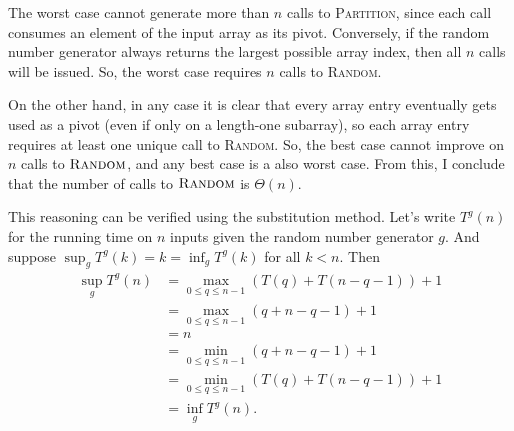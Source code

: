 \documentclass[
]{article}
\begin{document}
The worst case cannot generate more than $n$ calls to \textsc{Partition}, since each call consumes an element of the input array as its pivot.  Conversely, if the random number generator always returns the largest possible array index, then all $n$ calls will be issued.  So, the worst case requires $n$ calls to \textsc{Random}. 


On the other hand, in any case it is clear that every array entry eventually gets used as a pivot (even if only on a length-one subarray), so each array entry requires at least one unique call to \textsc{Random}.  So, the best case cannot improve on $n$ calls to $\textsc{Random}$, and any best case is a also worst case.  From this, I conclude that the number of calls to $\textsc{Random}$ is $\Theta(n)$.

This reasoning can be verified using the substitution method.  Let's write $T^g(n)$ for the running time on $n$ inputs given the random number generator $g$.  
And suppose $\sup_gT^g(k)= k = \inf_gT^g(k)$ for all $k<n$.  Then
\begin{align*}
  \sup_g T^g(n) &= \max_{0\leq q\leq n - 1}(T(q) + T(n-q-1)) + 1
  \\
                &=
                  \max_{0\leq q\leq n-1}(q + n - q - 1) + 1
  \\
                &=
                  n
  \\
                &=
                  \min_{0\leq q\leq n-1} (q + n - q - 1) + 1
  \\
                &=
                  \min_{0\leq q\leq n-1} (T(q) + T(n-q-1)) + 1
  \\
                &=
                  \inf_gT^g(n).
\end{align*}
\end{document}
